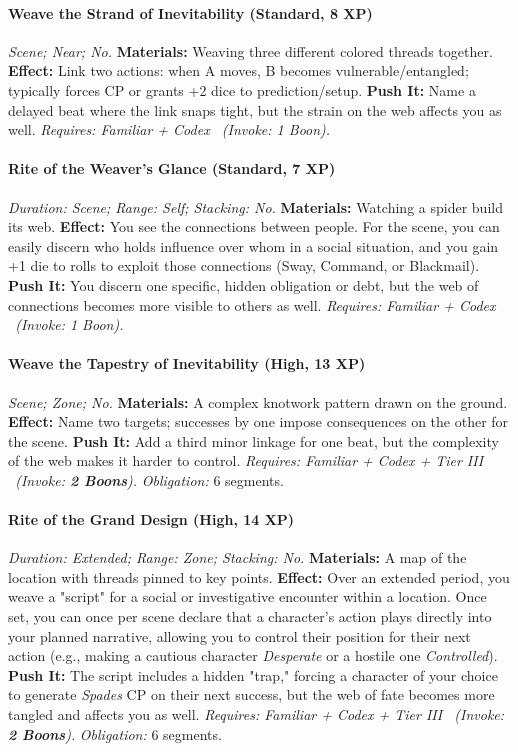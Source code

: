 \documentclass[12pt,twoside]{book}
\begin{document}
\paragraph{Weave the Strand of Inevitability (Standard, 8 XP)} \emph{Scene; Near; No.}
\textbf{Materials:} Weaving three different colored threads together.
\textbf{Effect:} Link two actions: when A moves, B becomes vulnerable/entangled; typically forces CP or grants +2 dice to prediction/setup.
\textbf{Push It:} Name a delayed beat where the link snaps tight, but the strain on the web affects you as well.
\emph{Requires: Familiar + Codex \ (\textit{Invoke:} 1 Boon).}
\paragraph{Rite of the Weaver's Glance (Standard, 7 XP)} \emph{Duration: Scene; Range: Self; Stacking: No.}
\textbf{Materials:} Watching a spider build its web.
\textbf{Effect:} You see the connections between people. For the scene, you can easily discern who holds influence over whom in a social situation, and you gain +1 die to rolls to exploit those connections (Sway, Command, or Blackmail).
\textbf{Push It:} You discern one specific, hidden obligation or debt, but the web of connections becomes more visible to others as well.
\emph{Requires: Familiar + Codex \ (\textit{Invoke:} 1 Boon).}
\paragraph{Weave the Tapestry of Inevitability (High, 13 XP)} \emph{Scene; Zone; No.}
\textbf{Materials:} A complex knotwork pattern drawn on the ground.
\textbf{Effect:} Name two targets; successes by one impose consequences on the other for the scene.
\textbf{Push It:} Add a third minor linkage for one beat, but the complexity of the web makes it harder to control.
\emph{Requires: Familiar + Codex + Tier III \ (\textit{Invoke:} \textbf{2 Boons}).}
\emph{Obligation:} 6 segments.

\paragraph{Rite of the Grand Design (High, 14 XP)} \emph{Duration: Extended; Range: Zone; Stacking: No.}
\textbf{Materials:} A map of the location with threads pinned to key points.
\textbf{Effect:} Over an extended period, you weave a "script" for a social or investigative encounter within a location. Once set, you can once per scene declare that a character's action plays directly into your planned narrative, allowing you to control their position for their next action (e.g., making a cautious character \emph{Desperate} or a hostile one \emph{Controlled}).
\textbf{Push It:} The script includes a hidden "trap," forcing a character of your choice to generate \emph{Spades} CP on their next success, but the web of fate becomes more tangled and affects you as well.
\emph{Requires: Familiar + Codex + Tier III \ (\textit{Invoke:} \textbf{2 Boons}).}
\emph{Obligation:} 6 segments.
\end{document}
